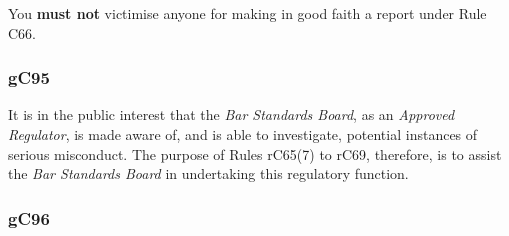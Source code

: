 
You \textcolor{myred}{\textbf{must not}} victimise anyone for making in good faith a report under
Rule C66.



\subsubsection{\color{darkgrey}gC95}

It is in the public interest that the \emph{Bar Standards Board}, as an
\emph{Approved Regulator}, is made aware of, and is able to investigate,
potential instances of serious misconduct. The purpose of Rules rC65(7)
to rC69, therefore, is to assist the \emph{Bar Standards Board} in
undertaking this regulatory function.

\subsubsection{\color{darkgrey}gC96}

